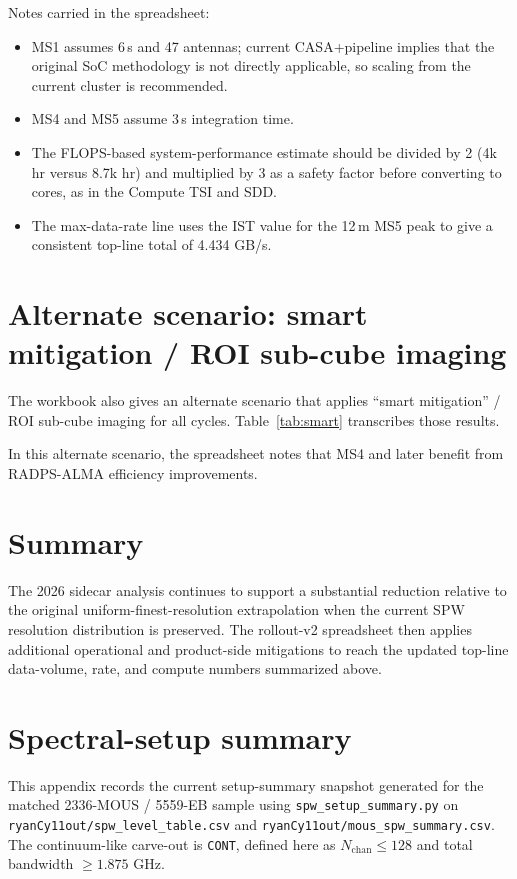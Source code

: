\documentclass[11pt]{article}
\begin{document}
Notes carried in the spreadsheet:
\begin{itemize}
\item MS1 assumes 6\,s and 47 antennas; current CASA+pipeline implies that the
  original SoC methodology is not directly applicable, so scaling from the
  current cluster is recommended.
\item MS4 and MS5 assume 3\,s integration time.
\item The FLOPS-based system-performance estimate should be divided by 2
  (4k hr versus 8.7k hr) and multiplied by 3 as a safety factor before
  converting to cores, as in the Compute TSI and SDD.
\item The max-data-rate line uses the IST value for the 12\,m MS5 peak to give a
  consistent top-line total of 4.434 GB/s.
\end{itemize}

\section{Alternate scenario: smart mitigation / ROI sub-cube imaging}
The workbook also gives an alternate scenario that applies ``smart
mitigation'' / ROI sub-cube imaging for all cycles.  Table~\ref{tab:smart}
transcribes those results.

In this alternate scenario, the spreadsheet notes that MS4 and later benefit
from RADPS-ALMA efficiency improvements.

\section{Summary}
The 2026 sidecar analysis continues to support a substantial reduction relative
to the original uniform-finest-resolution extrapolation when the current SPW
resolution distribution is preserved.  The rollout-v2 spreadsheet then applies
additional operational and product-side mitigations to reach the updated top-line
data-volume, rate, and compute numbers summarized above.

\clearpage
\appendix
\section{Spectral-setup summary}
This appendix records the current setup-summary snapshot generated for the
matched 2336-MOUS / 5559-EB sample using \texttt{spw\_setup\_summary.py} on
\texttt{ryanCy11out/spw\_level\_table.csv} and
\texttt{ryanCy11out/mous\_spw\_summary.csv}.  The continuum-like carve-out is
\texttt{CONT}, defined here as $N_{\mathrm{chan}} \le 128$ and total bandwidth
$\ge 1.875$ GHz.
\end{document}
